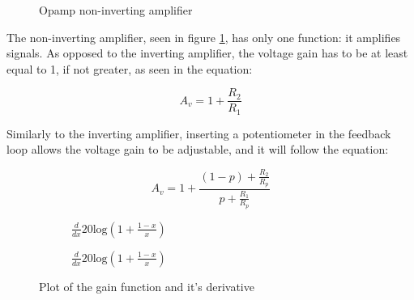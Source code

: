 \begin{figure}[H]
    \center
    
    \caption{Opamp non-inverting amplifier}
    \label{fig:noninvamp}
\end{figure}

The non-inverting amplifier, seen in figure \ref{fig:noninvamp}, has only one
function: it amplifies signals\cite{serban}. As opposed to the inverting amplifier, the
voltage gain has to be at least equal to 1, if not greater, as seen in the
equation:

\begin{equation}\label{eq:noninvamp}
    A_v = 1 + \frac{R_2}{R_1}
\end{equation}

Similarly to the inverting amplifier, inserting a potentiometer in the feedback
loop allows the voltage gain to be adjustable, and it will follow the equation:

\begin{equation}
    A_v = 1 + \frac{(1-p)+\frac{R_2}{R_p}}{p+\frac{R_1}{R_p}}
\end{equation}

\begin{figure}[H]
    \begin{subfigure}{0.5\textwidth}
        \caption{$\frac{d}{dx}20\text{log}(1+\frac{1-x}{x})$}
        \label{fig:noninvamp-gain-a}
    \end{subfigure}
    \hspace*{\fill}
    \begin{subfigure}{0.5\textwidth}
        \caption{$\frac{d}{dx}20\text{log}(1+\frac{1-x}{x})$}
        \label{fig:noninvamp-gain-b}
    \end{subfigure}
    \caption{Plot of the gain function and it's derivative}
    \label{fig:noninvamp-gain}
\end{figure}

